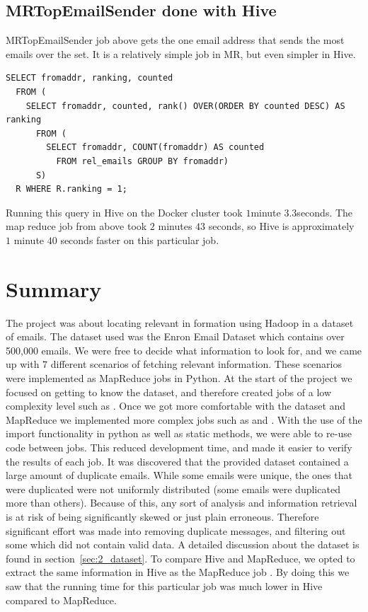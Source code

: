 \documentclass[runningheads,a4paper]{llncs}
\begin{document}
\subsection{MRTopEmailSender done with Hive}
\label{hivetopsender}
MRTopEmailSender job above gets the one email address that sends the most emails over the set. It is a relatively simple job in MR, but even simpler in Hive.
\begin{verbatim}
SELECT fromaddr, ranking, counted 
  FROM (
    SELECT fromaddr, counted, rank() OVER(ORDER BY counted DESC) AS ranking
      FROM (
        SELECT fromaddr, COUNT(fromaddr) AS counted 
          FROM rel_emails GROUP BY fromaddr) 
      S) 
  R WHERE R.ranking = 1;
\end{verbatim}
Running this query in Hive on the Docker cluster took $1$minute $3.3$seconds. The map reduce job from above took $2$ minutes $43$ seconds, so Hive is approximately $1$ minute $40$ seconds faster on this particular job.

\section{Summary}
The project was about locating relevant in formation using Hadoop in a dataset of emails. The dataset used was the Enron Email Dataset\cite{dataset} which contains over 500,000 emails. We were free to decide what information to look for, and we came up with 7 different scenarios of fetching relevant information. These scenarios were implemented as MapReduce jobs in Python. At the start of the project we focused on getting to know the dataset, and therefore created jobs of a low complexity level such as \texttt{}. Once we got more comfortable with the dataset and MapReduce we implemented more complex jobs such as \texttt{} and \texttt{}. With the use of the import functionality in python as well as static methods, we were able to re-use code between jobs. This reduced development time, and made it easier to verify the results of each job.
\newline
\newline
It was discovered that the provided dataset contained a large amount of duplicate emails. While some emails were unique, the ones that were duplicated were not uniformly distributed (some emails were duplicated more than others). Because of this, any sort of analysis and information retrieval is at risk of being significantly skewed or just plain erroneous. Therefore significant effort was made into removing duplicate messages, and filtering out some which did not contain valid data. A detailed discussion about the dataset is found in section~\ref{sec:2_dataset}.
\newline
\newline
To compare Hive and MapReduce, we opted to extract the same information in Hive as the MapReduce job \texttt{}. By doing this we saw that the running time for this particular job was much lower in Hive compared to MapReduce.
\end{document}
